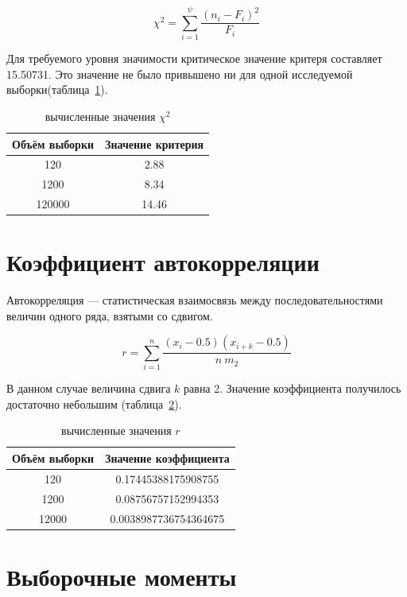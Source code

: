 \documentclass[a4paper,12pt]{article}
\begin{document}
{\large $$\chi^2 = \sum\limits_{i=1}^\psi \frac{(n_i - F_i)^2}{F_i}$$}

Для требуемого уровня значимости критическое значение критеря составляет 15.50731. Это значение не было привышено ни для одной исследуемой выборки(таблица~\ref{table:chi}).

\begin{table}[h]
	\caption{вычисленные значения $\chi^2$}
	\begin{tabular}{|c|c|}
	\hline 
	Объём выборки & Значение критерия \\ 
	\hline 
	120 & 2.88 \\ 
	\hline 
	1200 & 8.34 \\ 
	\hline 
	120000 & 14.46 \\ 
	\hline 
	\end{tabular}
	
	\label{table:chi}
\end{table}



\newpage\section{Коэффициент автокорреляции}

Автокорреляция — статистическая взаимосвязь между последовательностями величин одного ряда, взятыми со сдвигом. 

{\large $$r = \sum\limits_{i=1}^n \frac{(x_i-0.5)(x_{i+k}-0.5)}{n \ m_2}$$}

В данном случае величина сдвига $k$ равна 2. Значение коэффициента получилось достаточно небольшим (таблица~\ref{table:r}).

\begin{table}[h]
	\caption{вычисленные значения $r$}
	\begin{tabular}{|c|c|}
	\hline 
	Объём выборки & Значение коэффициента \\ 
	\hline 
	120   & 0.17445388175908755   \\ 
	\hline 
	1200  & 0.08756757152994353   \\ 
	\hline 
	12000 & 0.0038987736754364675 \\ 
	\hline 
	\end{tabular} 
	\label{table:r}
\end{table}

\newpage\section{Выборочные моменты}
\end{document}
